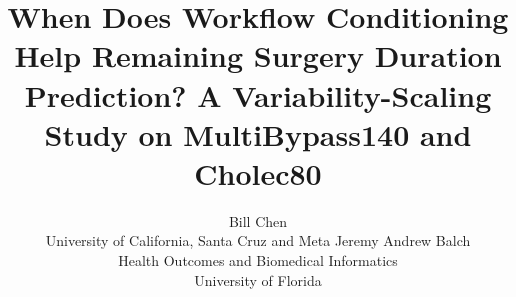 \documentclass{article}
\title{When Does Workflow Conditioning Help Remaining Surgery Duration Prediction? A Variability-Scaling Study on MultiBypass140 and Cholec80}
\author{
Bill Chen\\
University of California, Santa Cruz and Meta
\And
Jeremy Andrew Balch\\
Health Outcomes and Biomedical Informatics\\
University of Florida
}
\begin{document}
\maketitle

\begin{abstract}

\end{abstract}



\clearpage


\clearpage


\end{document}

